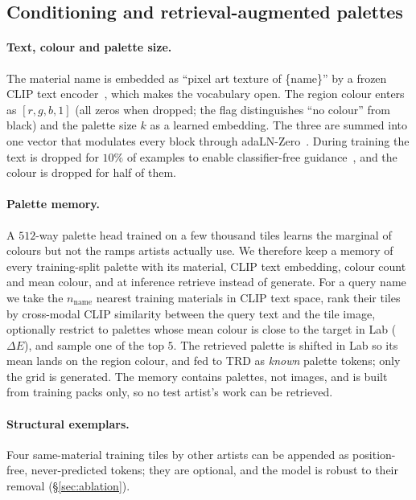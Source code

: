 \documentclass{article}
\newcommand{\trd}{\textsc{TRD}}
\begin{document}
\subsection{Conditioning and retrieval-augmented palettes}
\label{sec:cond}

\paragraph{Text, colour and palette size.} The material name is embedded as
``pixel art texture of \{name\}'' by a frozen CLIP text
encoder~\citep{radford2021clip}, which makes the vocabulary open. The region
colour enters as $[r,g,b,1]$ (all zeros when dropped; the flag distinguishes
``no colour'' from black) and the palette size $k$ as a learned embedding. The
three are summed into one vector that modulates every block through
adaLN-Zero~\citep{peebles2023dit}. During training the text is dropped for $10\%$ of
examples to enable classifier-free guidance~\citep{ho2022cfg}, and the colour
is dropped for half of them.

\paragraph{Palette memory.} A $512$-way palette head trained on a few
thousand tiles learns the marginal of colours but not the ramps artists
actually use. We therefore keep a memory
of every training-split palette with its material, CLIP text embedding, colour
count and mean colour, and at inference retrieve instead of generate. For a
query name we take the $n_\text{name}$ nearest training materials in CLIP text
space, rank their tiles by cross-modal CLIP similarity between the query text
and the tile image, optionally restrict to palettes whose mean colour is close
to the target in Lab ($\Delta E$), and sample one of the top $5$. The
retrieved palette is shifted in Lab so its mean lands on the region colour,
and fed to \trd{} as \emph{known} palette tokens; only the grid is generated.
The memory contains palettes, not images, and is built from training packs
only, so no test artist's work can be retrieved.

\paragraph{Structural exemplars.} Four same-material training tiles by other
artists can be appended as position-free, never-predicted tokens; they are
optional, and the model is robust to their removal (\S\ref{sec:ablation}).
\end{document}

